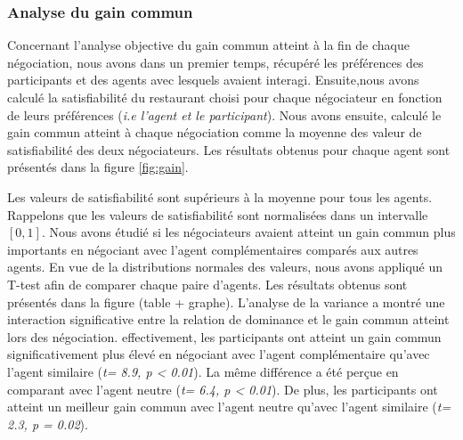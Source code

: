 	\subsubsection{Analyse du gain commun } Concernant l'analyse objective du gain commun atteint à la fin de chaque négociation, nous avons dans un premier temps, récupéré les préférences des participants et des agents avec lesquels avaient interagi. 
	Ensuite,nous avons calculé la satisfiabilité du restaurant choisi pour chaque négociateur en fonction de leurs préférences (\textit{i.e l'agent et le participant}). Nous avons ensuite, calculé le gain commun atteint à chaque négociation comme la moyenne des valeur de satisfiabilité des deux négociateurs.  Les résultats obtenus pour chaque agent sont présentés dans la figure \ref{fig:gain}. 
	
	Les valeurs de satisfiabilité sont supérieurs à la moyenne pour tous les agents. Rappelons que les valeurs de satisfiabilité sont normalisées dans un intervalle $[0, 1]$. Nous avons étudié si les négociateurs avaient atteint un gain commun plus importants en négociant avec l'agent complémentaires comparés aux autres agents. En vue de la distributions normales des valeurs, nous avons appliqué un T-test afin de comparer chaque paire d'agents. Les résultats obtenus sont présentés dans la figure (table + graphe). L'analyse de la variance a montré une interaction significative entre la relation de dominance et le gain commun atteint lors des négociation. effectivement, les participants ont atteint un gain commun significativement plus élevé en négociant avec l'agent complémentaire qu'avec l'agent similaire (\emph{t= 8.9, p < 0.01}). La même différence a été perçue en comparant avec l'agent neutre (\emph{t= 6.4, p < 0.01}).
	De plus, les participants ont atteint un meilleur gain commun avec l'agent neutre qu'avec l'agent similaire (\emph{t= 2.3, p = 0.02}).
	
